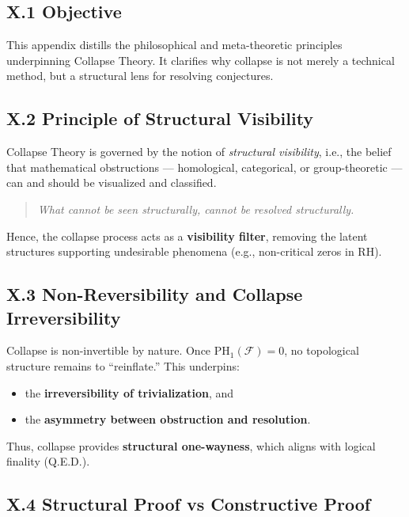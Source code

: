 \documentclass[11pt]{article}
\begin{document}
\subsection*{X.1 Objective}

This appendix distills the philosophical and meta-theoretic principles underpinning Collapse Theory. It clarifies why collapse is not merely a technical method, but a structural lens for resolving conjectures.

\subsection*{X.2 Principle of Structural Visibility}

Collapse Theory is governed by the notion of \emph{structural visibility}, i.e., the belief that mathematical obstructions — homological, categorical, or group-theoretic — can and should be visualized and classified.

\begin{quote}
\emph{What cannot be seen structurally, cannot be resolved structurally.}
\end{quote}

Hence, the collapse process acts as a \textbf{visibility filter}, removing the latent structures supporting undesirable phenomena (e.g., non-critical zeros in RH).

\subsection*{X.3 Non-Reversibility and Collapse Irreversibility}

Collapse is non-invertible by nature. Once \( \mathrm{PH}_1(\mathcal{F}) = 0 \), no topological structure remains to “reinflate.” This underpins:

\begin{itemize}
  \item the \textbf{irreversibility of trivialization}, and
  \item the \textbf{asymmetry between obstruction and resolution}.
\end{itemize}

Thus, collapse provides \textbf{structural one-wayness}, which aligns with logical finality (Q.E.D.).

\subsection*{X.4 Structural Proof vs Constructive Proof}
\end{document}

